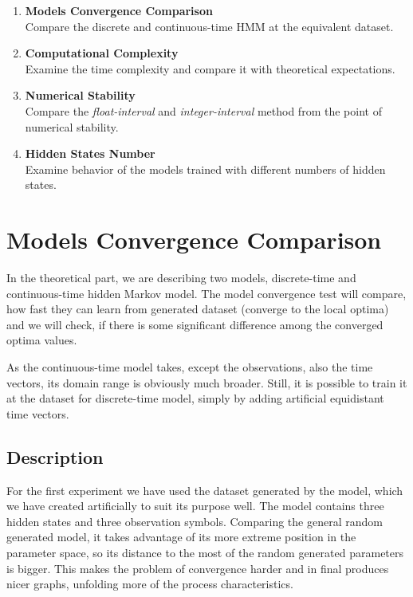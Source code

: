 \documentclass[thesis=M,english]{FITthesis}[2012/10/20]
\begin{document}
\begin{enumerate}[resume]
\setcounter{enumi}{0}
\item \textbf{Models Convergence Comparison} \\
Compare the discrete and continuous-time HMM at the equivalent dataset.
\item \textbf{Computational Complexity} \\
Examine the time complexity and compare it with theoretical expectations.
\item \textbf{Numerical Stability} \\
Compare the \textit{float-interval} and \textit{integer-interval} method from the point of numerical stability.
\item \textbf{Hidden States Number} \\
Examine behavior of the models trained with different numbers of hidden states.

\end{enumerate}


\section{Models Convergence Comparison}

In the theoretical part, we are describing two models, discrete-time and continuous-time hidden Markov model. The model convergence test will compare, how fast they can learn from generated dataset (converge to the local optima) and we will check, if there is some significant difference among the converged optima values. 

As the continuous-time model takes, except the observations, also the time vectors, its domain range is obviously much broader. Still, it is possible to train it at the dataset for discrete-time model, simply by adding artificial equidistant time vectors.

\subsection{ Description }

For the first experiment we have used the dataset generated by the model, which we have created artificially to suit its purpose well. %
The model contains three hidden states and three observation symbols. Comparing the general random generated model, it takes advantage of its more extreme position in the parameter space, so its distance to the most of the random generated parameters is bigger. This makes the problem of convergence harder and in final produces nicer graphs, unfolding more of the process characteristics.
\end{document}
